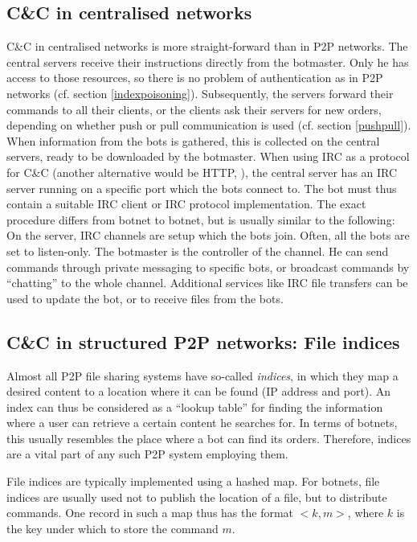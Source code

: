 \documentclass{llncs}
\begin{document}
\subsection{C\&C in centralised networks}
C\&C in centralised networks is more straight-forward than in P2P
networks. The central servers receive their instructions directly from
the botmaster. Only he has access to those resources, so there is no
problem of authentication as in P2P networks
(cf. section \ref{indexpoisoning}). Subsequently, the servers forward their
commands to all their clients, or the clients ask their servers for
new orders, depending on whether push or pull communication is used
(cf. section \ref{pushpull}). When information from the bots is gathered, this
is collected on the central servers, ready to be downloaded by the
botmaster. When using IRC as a protocol for C\&C (another alternative
would be HTTP, \cite{li2009botnet}), the central server has an IRC
server running on a specific port which the bots connect to. The bot
must thus contain a suitable IRC client or IRC protocol
implementation. The exact procedure differs from botnet to botnet, but
is usually similar to the following: On the server, IRC channels are
setup which the bots join. Often, all the bots are set to
listen-only. The botmaster is the controller of the channel. He can
send commands through private messaging to specific bots, or broadcast
commands by ``chatting'' to the whole channel. Additional services
like IRC file transfers can be used to update the bot, or to receive
files from the bots.

\subsection{C\&C in structured P2P networks: File indices}
\label{distribution}
Almost all P2P file sharing systems have so-called {\it indices}, in
which they map a desired content to a location where it can be found
(IP address and port). An index can thus be considered as a ``lookup
table'' for finding the information where a user can retrieve a
certain content he searches for. In terms of botnets, this usually
resembles the place where a bot can find its orders. Therefore,
indices are a vital part of any such P2P system employing them.

File indices are typically implemented using a hashed map. For
botnets, file indices are usually used not to publish the location of
a file, but to distribute commands. One record in such a map thus has
the format $<k, m>$, where $k$ is the key under which to store the
command $m$.
\end{document}
